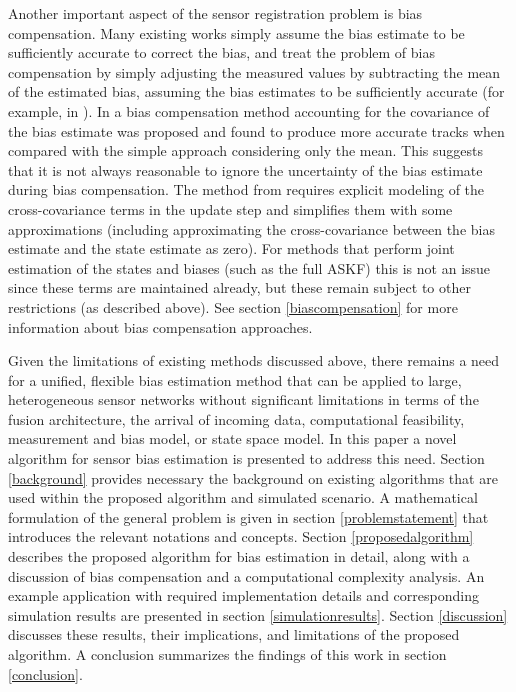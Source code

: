 \documentclass[journal]{IEEEtran}
\begin{document}
Another important aspect of the sensor registration problem is bias compensation. Many existing works simply assume the bias estimate to be sufficiently accurate to correct the bias, and treat the problem of bias compensation by simply adjusting the measured values by subtracting the mean of the estimated bias, assuming the bias estimates to be sufficiently accurate (for example, in \cite{song2021efficient}). In \cite{ying20103d} a bias compensation method accounting for the covariance of the bias estimate was proposed and found to produce more accurate tracks when compared with the simple approach considering only the mean. This suggests that it is not always reasonable to ignore the uncertainty of the bias estimate during bias compensation. The method from \cite{ying20103d} requires explicit modeling of the cross-covariance terms in the update step and simplifies them with some approximations (including approximating the cross-covariance between the bias estimate and the state estimate as zero). For methods that perform joint estimation of the states and biases (such as the full ASKF) this is not an issue since these terms are maintained already, but these remain subject to other restrictions (as described above). See section \ref{biascompensation} for more information about bias compensation approaches.

Given the limitations of existing methods discussed above, there remains a need for a unified, flexible bias estimation method that can be applied to large, heterogeneous sensor networks without significant limitations in terms of the fusion architecture, the arrival of incoming data, computational feasibility, measurement and bias model, or state space model. In this paper a novel algorithm for sensor bias estimation is presented to address this need. Section \ref{background} provides necessary the background on existing algorithms that are used within the proposed algorithm and simulated scenario. A mathematical formulation of the general problem is given in section \ref{problemstatement} that introduces the relevant notations and concepts. Section \ref{proposedalgorithm} describes the proposed algorithm for bias estimation in detail, along with a discussion of bias compensation and a computational complexity analysis. An example application with required implementation details and corresponding simulation results are presented in section \ref{simulationresults}. Section \ref{discussion} discusses these results, their implications, and limitations of the proposed algorithm. A conclusion summarizes the findings of this work in section \ref{conclusion}.
\end{document}
